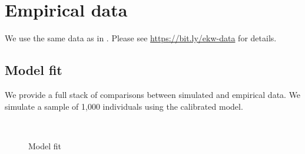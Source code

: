 \section{Empirical data}\label{Empirical data}
We use the same data as in \citet{Keane.1997}. Please see \url{https://bit.ly/ekw-data} for details.

\subsection{Model fit}

We provide a full stack of comparisons between simulated and empirical data. We simulate a sample of 1,000 individuals using the calibrated model.



\begin{figure}[h]\centering
	\caption{Model fit}\label{Model fit appendix}
	\hspace{0.3cm}
	 \\
	\hspace{0.3cm}
\end{figure}